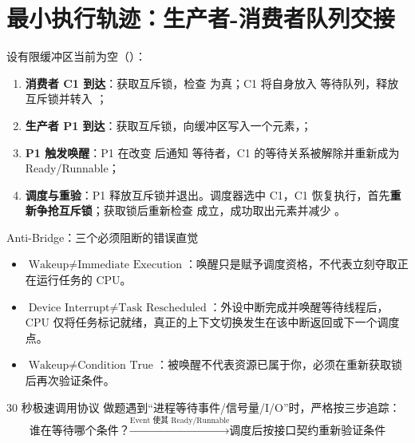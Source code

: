 \documentclass[UTF8,fontset=none,11pt,a4paper]{ctexart}
\begin{document}
\section{最小执行轨迹：生产者-消费者队列交接}

设有限缓冲区当前为空（）：
\begin{enumerate}
  \item \textbf{消费者 C1 到达}：获取互斥锁，检查  为真；C1 将自身放入  等待队列，释放互斥锁并转入 ；
  \item \textbf{生产者 P1 到达}：获取互斥锁，向缓冲区写入一个元素，；
  \item \textbf{P1 触发唤醒}：P1 在改变  后通知  等待者，C1 的等待关系被解除并重新成为 Ready/Runnable；
  \item \textbf{调度与重验}：P1 释放互斥锁并退出。调度器选中 C1，C1 恢复执行，首先\textbf{重新争抢互斥锁}；获取锁后重新检查  成立，成功取出元素并减少 。
\end{enumerate}

\begin{warnbox}{Anti-Bridge：三个必须阻断的错误直觉}
\begin{itemize}
  \item \(\text{Wakeup} \neq \text{Immediate Execution}\)：唤醒只是赋予调度资格，不代表立刻夺取正在运行任务的 CPU。
  \item \(\text{Device Interrupt} \neq \text{Task Rescheduled}\)：外设中断完成并唤醒等待线程后，CPU 仅将任务标记就绪，真正的上下文切换发生在该中断返回或下一个调度点。
  \item \(\text{Wakeup} \neq \text{Condition True}\)：被唤醒不代表资源已属于你，必须在重新获取锁后再次验证条件。
\end{itemize}
\end{warnbox}

\begin{corebox}{30 秒极速调用协议}
做题遇到“进程等待事件/信号量/I/O”时，严格按三步追踪：
\[
\boxed{\text{谁在等待哪个条件？}} \xrightarrow{\text{Event 使其 Ready/Runnable}} \boxed{\text{调度后按接口契约重新验证条件}}
\]
\end{corebox}
\end{document}

